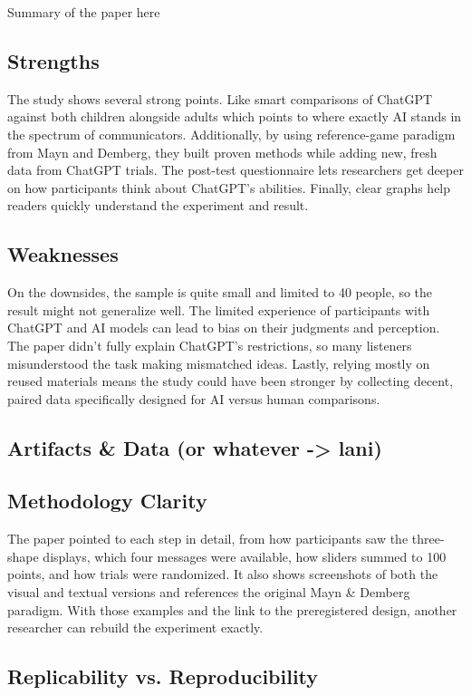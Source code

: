 \documentclass[12pt]{article}
\begin{document}
Summary of the paper here
\subsection{Strengths}

The study shows several strong points. Like smart comparisons of ChatGPT against both children alongside adults which points to where exactly AI stands in the spectrum of communicators. Additionally, by using reference-game paradigm from Mayn and Demberg, they built proven methods while adding new, fresh data from ChatGPT trials. The post-test questionnaire lets researchers get deeper on how participants think about ChatGPT’s abilities. Finally, clear graphs help readers quickly understand the experiment and result.

\subsection{Weaknesses}

On the downsides, the sample is quite small and limited to 40 people, so the result might not generalize well. The limited experience of participants with ChatGPT and AI models can lead to bias on their judgments and perception. The paper didn’t fully explain ChatGPT’s restrictions, so many listeners misunderstood the task making mismatched ideas. Lastly, relying mostly on reused materials means the study could have been stronger by collecting decent, paired data specifically designed for AI versus human comparisons.

\subsection{Artifacts \& Data (or whatever -> lani)}
\subsection{Methodology Clarity}

The paper pointed to each step in detail, from how participants saw the three-shape displays, which four messages were available, how sliders summed to 100 points, and how trials were randomized. It also shows screenshots of both the visual and textual versions and references the original Mayn & Demberg paradigm. With those examples and the link to the preregistered design, another researcher can rebuild the experiment exactly.

\subsection{Replicability vs. Reproducibility}
\end{document}
